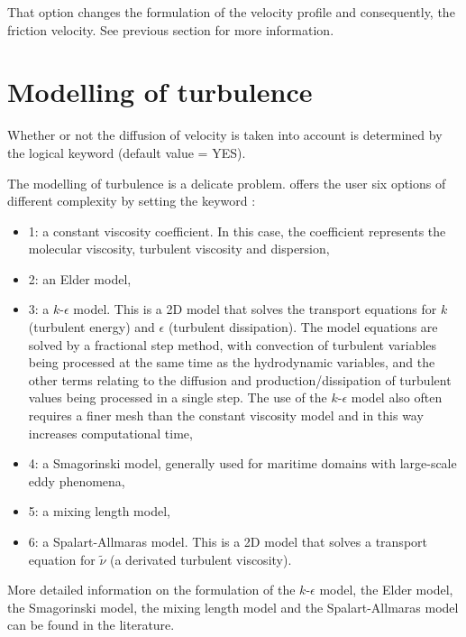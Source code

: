 That option changes the formulation of the velocity profile and consequently,
the friction velocity. See previous section for more information.


\section{Modelling of turbulence}
\label{sec:mod:turbul}
Whether or not the diffusion of velocity is taken into account is determined
by the logical keyword  (default value = YES).

The modelling of turbulence is a delicate problem.
 offers the user six options of different complexity by setting
the keyword :
\begin{itemize}
\item 1: a constant viscosity coefficient.
In this case, the coefficient represents the molecular viscosity,
turbulent viscosity and dispersion,

\item 2: an Elder model,

\item 3: a $k$-$\epsilon$ model.
This is a 2D model that solves the transport equations for $k$ (turbulent energy)
and $\epsilon$ (turbulent dissipation).
The model equations are solved by a fractional step method, with convection of
turbulent variables being processed at the same time as the hydrodynamic
variables, and the other terms relating to the diffusion and
production/dissipation of turbulent values being processed in a single step.
The use of the $k$-$\epsilon$ model also often requires a finer mesh
than the constant viscosity model and in this way increases computational time,

\item 4: a Smagorinski model, generally used for maritime
domains with large-scale eddy phenomena,

\item 5: a mixing length model,

\item 6: a Spalart-Allmaras model.
This is a 2D model that solves a transport equation for $\tilde{\nu}$
(a derivated turbulent viscosity).

\end{itemize}

More detailed information on the formulation of the $k$-$\epsilon$ model,
the Elder model, the Smagorinski model, the mixing length model and the
Spalart-Allmaras model can be found in the literature.

